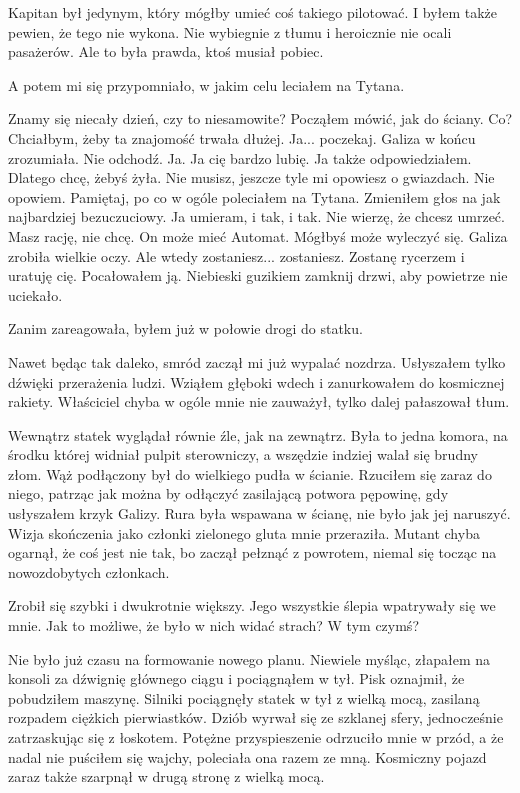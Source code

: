 Kapitan był jedynym, który mógłby umieć coś takiego pilotować.
I byłem także pewien, że tego nie wykona.
Nie wybiegnie z tłumu i heroicznie nie ocali pasażerów.
Ale to była prawda, ktoś musiał pobiec.

A potem mi się przypomniało, w jakim celu leciałem na Tytana.
\begin{dialogue}
	\ds{} Znamy się niecały dzień, czy to niesamowite? \dm{} Począłem mówić, jak do ściany.
	\ds{} Co?
	\ds{} Chciałbym, żeby ta znajomość trwała dłużej.
	\ds{} Ja... poczekaj. \dm{} Galiza w końcu zrozumiała. \dm{} Nie odchodź. Ja. Ja cię bardzo lubię.
	\ds{} Ja także \dm{} odpowiedziałem. \dm{} Dlatego chcę, żebyś żyła.
	\ds{} Nie musisz, jeszcze tyle mi opowiesz o gwiazdach.
	\ds{} Nie opowiem. Pamiętaj, po co w ogóle poleciałem na Tytana. \dm{} Zmieniłem głos na jak najbardziej bezuczuciowy. \dm{} Ja umieram, i tak, i tak.
	\ds{} Nie wierzę, że chcesz umrzeć.
	\ds{} Masz rację, nie chcę.
	\ds{} On może mieć Automat. Mógłbyś może wyleczyć się. \dm{} Galiza zrobiła wielkie oczy. \dm{} Ale wtedy zostaniesz... zostaniesz.
	\ds{} Zostanę rycerzem i uratuję cię. \dm{} Pocałowałem ją. \dm{} Niebieski guzikiem zamknij drzwi, aby powietrze nie uciekało.
\end{dialogue}

Zanim zareagowała, byłem już w połowie drogi do statku.

Nawet będąc tak daleko, smród zaczął mi już wypalać nozdrza.
Usłyszałem tylko dźwięki przerażenia ludzi.
Wziąłem głęboki wdech i zanurkowałem do kosmicznej rakiety.
Właściciel chyba w ogóle mnie nie zauważył, tylko dalej pałaszował tłum.

Wewnątrz statek wyglądał równie źle, jak na zewnątrz.
Była to jedna komora, na środku której widniał pulpit sterowniczy, a wszędzie indziej walał się brudny złom.
Wąż podłączony był do wielkiego pudła w ścianie.
Rzuciłem się zaraz do niego, patrząc jak można by odłączyć zasilającą potwora pępowinę, gdy usłyszałem krzyk Galizy.
Rura była wspawana w ścianę, nie było jak jej naruszyć. Wizja skończenia jako członki zielonego gluta mnie przeraziła.
Mutant chyba ogarnął, że coś jest nie tak, bo zaczął pełznąć z powrotem, niemal się tocząc na nowozdobytych członkach.

Zrobił się szybki i dwukrotnie większy.
Jego wszystkie ślepia wpatrywały się we mnie.
Jak to możliwe, że było w nich widać strach? W tym czymś?

Nie było już czasu na formowanie nowego planu.
Niewiele myśląc, złapałem na konsoli za dźwignię głównego ciągu i pociągnąłem w tył.
Pisk oznajmił, że pobudziłem maszynę. Silniki pociągnęły statek w tył z wielką mocą, zasilaną rozpadem ciężkich pierwiastków.
Dziób wyrwał się ze szklanej sfery, jednocześnie zatrzaskując się z łoskotem.
Potężne przyspieszenie odrzuciło mnie w przód, a że nadal nie puściłem się wajchy, poleciała ona razem ze mną.
Kosmiczny pojazd zaraz także szarpnął w drugą stronę z wielką mocą.

